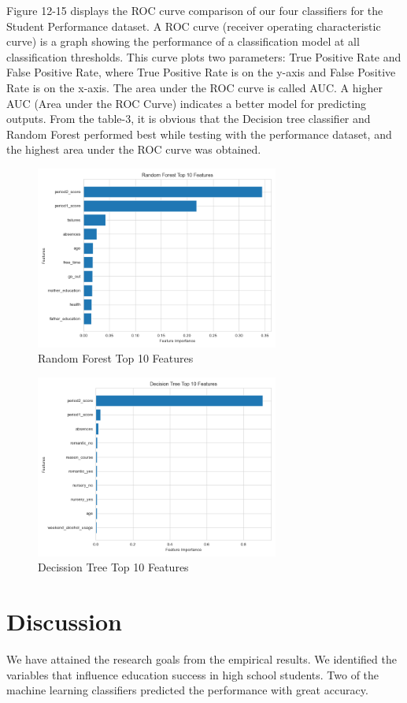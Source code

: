 \documentclass[conference]{IEEEtran}
\begin{document}
Figure 12-15 displays the ROC curve comparison of our four classifiers for the Student Performance dataset. A ROC curve (receiver operating characteristic curve) is a graph showing the performance of a classification model at all classification thresholds. This curve plots two parameters: True Positive Rate and False Positive Rate, where True Positive Rate is on the y-axis and False Positive Rate is on the x-axis. The area under the ROC curve is called AUC. A higher AUC (Area under the ROC Curve) indicates a better model for predicting outputs. From the table-3, it is obvious that the Decision tree classifier and Random Forest performed best while testing with the performance dataset, and the highest area under the ROC curve was obtained.

\begin{figure}[H]
    \centering
    \includegraphics[width=8cm]{fig17.png}
    \caption{Random Forest Top 10 Features}
    \label{fig:17}
\end{figure}

\begin{figure}[H]
    \centering
    \includegraphics[width=8cm]{fig18.png}
    \caption{Decission Tree Top 10 Features}
    \label{fig:18}
\end{figure}
\section{Discussion}
We have attained the research goals from the empirical results. We identified the variables that influence education success in high school students. Two of the machine learning classifiers predicted the performance with great accuracy.
\end{document}
